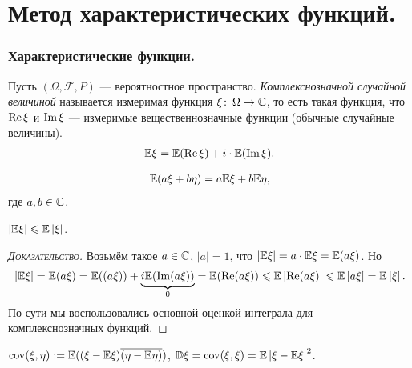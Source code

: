 \documentclass[../main.tex]{subfiles}
\begin{document}
\newpage
\part{Метод характеристических функций.}
\section{Характеристические функции.}
\begin{df}
 Пусть $ (\Omega, \mathcal F, P) $ --- вероятностное пространство.
 \textit{Комплекснозначной случайной величиной} называется измеримая функция $ \xi \colon\, \Omega \to \mathbb{C} $, то есть такая функция, что $ \operatorname{Re} \xi $ и $ \operatorname{Im} \xi $ --- измеримые вещественнозначные функции (обычные случайные величины).
 \begin{align*}
  \mathbb E \xi = \mathbb E (\operatorname{Re} \xi) + i \cdot \mathbb E (\operatorname{Im} \xi).
 \end{align*}
\end{df}
\begin{prop}
 \begin{align*}
  \mathbb E(a\xi + b\eta) = a \mathbb E \xi + b \mathbb E \eta,
 \end{align*} где $ a,b \in \mathbb{C} $.
\end{prop}
\begin{prop}
 $ \left| \mathbb E \xi \right| \leqslant \mathbb E \left| \xi \right| $.
\end{prop}
\begin{proof}[\normalfont\textsc{Доказательство}]
 Возьмём такое $ a \in \mathbb{C} $, $ \left| a \right| = 1 $, что $ \left| \mathbb E \xi \right| = a \cdot \mathbb E \xi = \mathbb E(a\xi) $. Но
 \begin{align*}
  \left| \E\xi \right| = \E(a\xi) = \E(\real(a\xi)) + \underbrace{i\E(\Imaginary(a\xi))}_{0} = \E(\Real(a\xi)) \leqslant \E \left| \Real(a\xi) \right| \leqslant \E \left| a\xi \right| = \E \left| \xi \right|.
 \end{align*} По сути мы воспользовались основной оценкой интеграла для комплекснозначных функций.
\end{proof}

\begin{df}
 $ \mathrm{cov}(\xi,\eta) := \mathbb E((\xi-\mathbb E\xi) \overline{(\eta - \mathbb E\eta)}) $, $ \mathbb D\xi = \mathrm{cov}(\xi,\xi) = \mathbb E \left| \xi - \mathbb E\xi \right|^{2} $.
\end{df}
\end{document}
